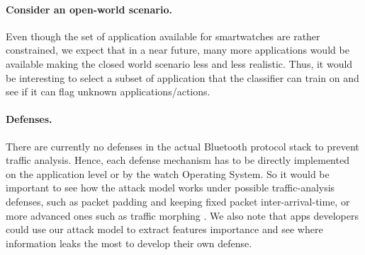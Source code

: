 \paragraph{Consider an open-world scenario.} Even though the set of application available for smartwatches are rather constrained, we expect that in a near future, many more applications would be available making the closed world scenario less and less realistic. Thus, it would be interesting to select a subset of application that the classifier can train on and see if it can flag unknown applications/actions.




\paragraph{Defenses.} There are currently no defenses in the actual Bluetooth protocol stack to prevent traffic analysis. Hence, each defense mechanism has to be directly implemented on the application level or by the watch Operating System. So it would be important to see how the attack model works under possible traffic-analysis defenses, such as packet padding and keeping fixed packet inter-arrival-time, or more advanced ones such as traffic morphing \cite{wright2009traffic}. We also note that apps developers could use our attack model to extract features importance and see where information leaks the most to develop their own defense.



